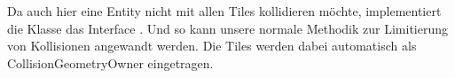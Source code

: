 Da auch hier eine Entity nicht mit allen Tiles kollidieren möchte, implementiert die Klasse  das Interface . Und so kann unsere normale Methodik zur Limitierung von Kollisionen angewandt werden. Die Tiles werden dabei automatisch als CollisionGeometryOwner eingetragen.
